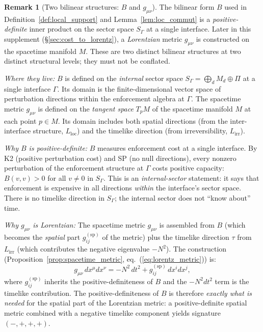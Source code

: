 \documentclass[11pt,a4paper]{article}
\theoremstyle{definition}
\newtheorem{remark}[theorem]{Remark}
\begin{document}
\begin{remark}[Two bilinear structures: $B$ and $g_{\mu\nu}$]%
\label{rem:two_bilinear}
The bilinear form $B$ used in Definition~\ref{def:local_support} and
Lemma~\ref{lem:loc_commut} is a \emph{positive-definite} inner product
on the sector space $S_\Gamma$ at a single interface.  Later in this
supplement (\S\ref{sec:cost_to_lorentz}), a \emph{Lorentzian} metric
$g_{\mu\nu}$ is constructed on the spacetime manifold $M$.  These are
two distinct bilinear structures at two distinct structural levels;
they must not be conflated.

\smallskip\noindent\textit{Where they live:}\quad
$B$ is defined on the \emph{internal} sector space
$S_\Gamma = \bigoplus_d M_d \oplus \Pi$ at a single interface
$\Gamma$.  Its domain is the finite-dimensional vector space of
perturbation directions within the enforcement algebra at $\Gamma$.
The spacetime metric $g_{\mu\nu}$ is defined on the \emph{tangent
space} $T_p M$ of the spacetime manifold $M$ at each point
$p \in M$.  Its domain includes both spatial directions (from the
inter-interface structure, $L_{\mathrm{loc}}$) and the timelike
direction (from irreversibility, $L_{\mathrm{irr}}$).

\smallskip\noindent\textit{Why $B$ is positive-definite:}\quad
$B$ measures enforcement cost at a single interface.  By K2 (positive
perturbation cost) and SP (no null directions), every nonzero
perturbation of the enforcement structure at $\Gamma$ costs positive
capacity: $B(v,v) > 0$ for all $v \ne 0$ in $S_\Gamma$.  This is an
\emph{internal-sector} statement: it says that enforcement is
expensive in all directions \emph{within} the interface's sector space.
There is no timelike direction in $S_\Gamma$; the internal sector
does not ``know about'' time.

\smallskip\noindent\textit{Why $g_{\mu\nu}$ is Lorentzian:}\quad
The spacetime metric $g_{\mu\nu}$ is assembled from $B$ (which
becomes the \emph{spatial} part $g_{ij}^{(\mathrm{sp})}$ of the
metric) plus the timelike direction $\tau$ from $L_{\mathrm{irr}}$
(which contributes the negative eigenvalue $-N^2$).  The
construction (Proposition~\ref{prop:spacetime_metric}, eq.\
(\ref{eq:lorentz_metric})) is:
\[
  g_{\mu\nu}\,dx^\mu dx^\nu
  = -N^2\,dt^2 + g_{ij}^{(\mathrm{sp})}\,dx^i dx^j,
\]
where $g_{ij}^{(\mathrm{sp})}$ inherits the positive-definiteness of
$B$ and the $-N^2 dt^2$ term is the timelike contribution.  The
positive-definiteness of $B$ is therefore \emph{exactly what is
needed} for the spatial part of the Lorentzian metric: a
positive-definite spatial metric combined with a negative timelike
component yields signature $(-,+,+,+)$.


\end{remark}
\end{document}

